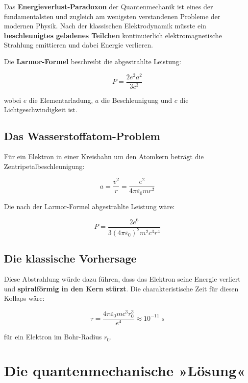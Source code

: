 \documentclass[12pt,a4paper]{report}
\begin{document}
	Das \textbf{Energieverlust-Paradoxon} der Quantenmechanik ist eines der fundamentalsten und zugleich am wenigsten verstandenen Probleme der modernen Physik. Nach der klassischen Elektrodynamik müsste ein \textbf{beschleunigtes geladenes Teilchen} kontinuierlich elektromagnetische Strahlung emittieren und dabei Energie verlieren.
	
	Die \textbf{Larmor-Formel} beschreibt die abgestrahlte Leistung:
	
	\begin{equation}
		P = \frac{2e^2a^2}{3c^3}
	\end{equation}
	
	wobei $e$ die Elementarladung, $a$ die Beschleunigung und $c$ die Lichtgeschwindigkeit ist.
	
	\subsection{Das Wasserstoffatom-Problem}
	
	Für ein Elektron in einer Kreisbahn um den Atomkern beträgt die Zentripetalbeschleunigung:
	
	\begin{equation}
		a = \frac{v^2}{r} = \frac{e^2}{4\pi\varepsilon_0 mr^2}
	\end{equation}
	
	Die nach der Larmor-Formel abgestrahlte Leistung wäre:
	
	\begin{equation}
		P = \frac{2e^6}{3(4\pi\varepsilon_0)^2 m^2 c^3 r^4}
	\end{equation}
	
	\subsection{Die klassische Vorhersage}
	
	Diese Abstrahlung würde dazu führen, dass das Elektron seine Energie verliert und \textbf{spiralförmig in den Kern stürzt}. Die charakteristische Zeit für diesen Kollaps wäre:
	
	\begin{equation}
		\tau = \frac{4\pi\varepsilon_0 m c^3 r_0^3}{e^4} \approx 10^{-11} \text{ s}
	\end{equation}
	
	für ein Elektron im Bohr-Radius $r_0$.
	
	\section{Die quantenmechanische »Lösung«}
	
\end{document}
